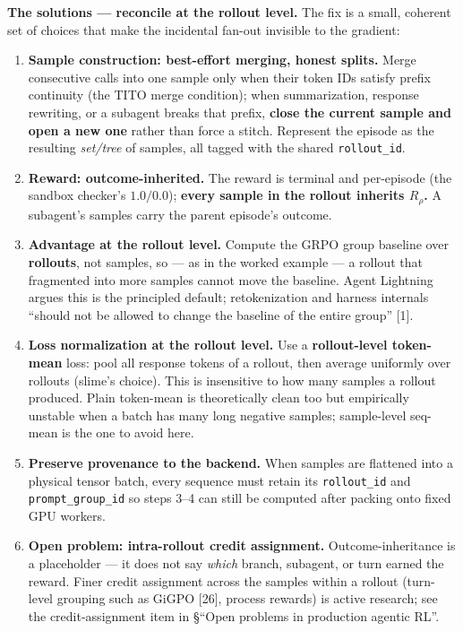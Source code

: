 \documentclass[
  paper=a4,
  ,captions=tableheading
]{scrartcl}
\providecommand{\tightlist}{%
  \setlength{\itemsep}{0pt}\setlength{\parskip}{0pt}}
\begin{document}
\textbf{The solutions --- reconcile at the rollout level.} The fix is a
small, coherent set of choices that make the incidental fan-out
invisible to the gradient:

\begin{enumerate}
\def\labelenumi{\arabic{enumi}.}
\tightlist
\item
  \textbf{Sample construction: best-effort merging, honest splits.}
  Merge consecutive calls into one sample only when their token IDs
  satisfy prefix continuity (the TITO merge condition); when
  summarization, response rewriting, or a subagent breaks that prefix,
  \textbf{close the current sample and open a new one} rather than force
  a stitch. Represent the episode as the resulting \emph{set/tree} of
  samples, all tagged with the shared \texttt{rollout\_id}.
\item
  \textbf{Reward: outcome-inherited.} The reward is terminal and
  per-episode (the sandbox checker's \(1.0/0.0\)); \textbf{every sample
  in the rollout inherits \(R_\rho\).} A subagent's samples carry the
  parent episode's outcome.
\item
  \textbf{Advantage at the rollout level.} Compute the GRPO group
  baseline over \textbf{rollouts}, not samples, so --- as in the worked
  example --- a rollout that fragmented into more samples cannot move
  the baseline. Agent Lightning argues this is the principled default;
  retokenization and harness internals ``should not be allowed to change
  the baseline of the entire group'' {[}1{]}.
\item
  \textbf{Loss normalization at the rollout level.} Use a
  \textbf{rollout-level token-mean} loss: pool all response tokens of a
  rollout, then average uniformly over rollouts (slime's choice). This
  is insensitive to how many samples a rollout produced. Plain
  token-mean is theoretically clean too but empirically unstable when a
  batch has many long negative samples; sample-level seq-mean is the one
  to avoid here.
\item
  \textbf{Preserve provenance to the backend.} When samples are
  flattened into a physical tensor batch, every sequence must retain its
  \texttt{rollout\_id} and \texttt{prompt\_group\_id} so steps 3--4 can
  still be computed after packing onto fixed GPU workers.
\item
  \textbf{Open problem: intra-rollout credit assignment.}
  Outcome-inheritance is a placeholder --- it does not say \emph{which}
  branch, subagent, or turn earned the reward. Finer credit assignment
  across the samples within a rollout (turn-level grouping such as GiGPO
  {[}26{]}, process rewards) is active research; see the
  credit-assignment item in §``Open problems in production agentic RL''.
\end{enumerate}
\end{document}
